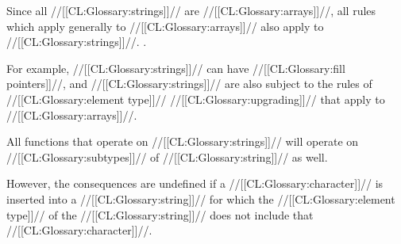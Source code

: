 

 

Since all //[[CL:Glossary:strings]]// are //[[CL:Glossary:arrays]]//, all rules which apply generally to //[[CL:Glossary:arrays]]// also apply to //[[CL:Glossary:strings]]//. \Seesection\ArrayConcepts.

For example,
     //[[CL:Glossary:strings]]// can have //[[CL:Glossary:fill pointers]]//,
 and //[[CL:Glossary:strings]]// are also subject to the rules of //[[CL:Glossary:element type]]// //[[CL:Glossary:upgrading]]//
        that apply to //[[CL:Glossary:arrays]]//.

\endsubsection%

 

All functions that operate on //[[CL:Glossary:strings]]//  will operate on //[[CL:Glossary:subtypes]]// of //[[CL:Glossary:string]]// as well.

However, the consequences are undefined if a //[[CL:Glossary:character]]// is inserted into a //[[CL:Glossary:string]]// for which the //[[CL:Glossary:element type]]// of the //[[CL:Glossary:string]]// does not include that //[[CL:Glossary:character]]//.

\endsubsection%
